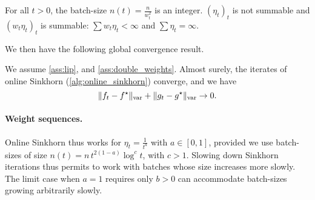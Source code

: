 \begin{assumption}\label{ass:double_weights}
    For all $t > 0$, the batch-size $n(t) = \frac{n}{w_t^2}$ is an integer. ${(\eta_t)}_t$ is
    not summable and ${(w_t \eta_t)}_t$ is summable: $\sum w_t \eta_t <
    \infty$ and $\sum \eta_t = \infty$.
\end{assumption}
We then have the following global convergence result.

\begin{proposition}\label{prop:convergence_true}
    We assume \autoref{ass:lip}, and
    \ref{ass:double_weights}. Almost surely, the iterates of online Sinkhorn
    (\autoref{alg:online_sinkhorn}) converge, and we have
    \begin{equation}
        \Vert f_t - f^\star \Vert_{\text{\upshape var}} + \Vert g_t - g^\star \Vert_{\text{\upshape var}} \to 0.
    \end{equation}
\end{proposition}

\paragraph{Weight sequences.}

Online Sinkhorn thus works for $\eta_t = \frac{1}{t^a}$ with $a \in [0, 1]$,
provided we use batch-sizes of size $n(t) = n\, t^{2(1-a)} \log^c t$, with $c > 1$.
Slowing down Sinkhorn iterations thus permits to work with batches whose size
increases more slowly. The limit case when $a = 1$ requires only $b > 0$ can accommodate
batch-sizes growing arbitrarily slowly.